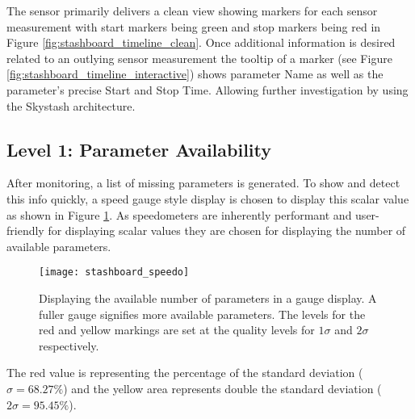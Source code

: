 The sensor primarily delivers a clean view showing markers for each sensor measurement with start markers being green and stop markers being red in Figure \ref{fig:stashboard_timeline_clean}. Once additional information is desired related to an outlying sensor measurement the tooltip of a marker (see Figure \ref{fig:stashboard_timeline_interactive}) shows parameter Name as well as the parameter's precise Start and Stop Time. Allowing further investigation by using the Skystash architecture.

\subsection{Level 1: Parameter Availability}
After monitoring, a list of missing parameters is generated. To show and detect this info quickly, a speed gauge style display is chosen to display this scalar value as shown in Figure \ref{fig:stashboard_speedo}. As speedometers are inherently performant and user-friendly for displaying scalar values they are chosen for displaying the number of available parameters.
\begin{figure}[!h]
    \centering
    \texttt{[image: stashboard\_speedo]}
    \caption[Stashboard: Level 1]{Displaying the available number of parameters in a gauge display. A fuller gauge signifies more available parameters. The levels for the red and yellow markings are set at the quality levels for $1\sigma$ and $2\sigma$ respectively.}
    \label{fig:stashboard_speedo}
\end{figure}
The red value is representing the percentage of the standard deviation ($\sigma=68.27\%$) and the yellow area represents double the standard deviation ($2\sigma=95.45\%$).

